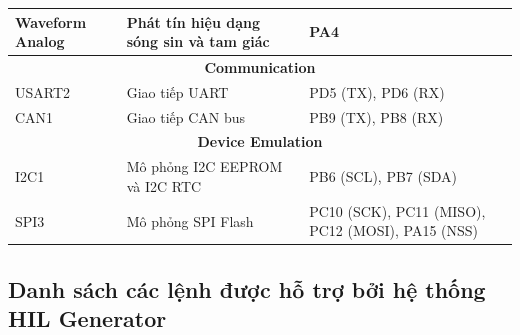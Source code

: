 \begin{table}[H]
\begin{tabularx}{\textwidth}{|l|X|X|}
Waveform Analog 
& Phát tín hiệu dạng sóng sin và tam giác 
& PA4 \\
\hline

\multicolumn{3}{|c|}{\textbf{Communication}} \\
\hline

USART2 
& Giao tiếp UART 
& PD5 (TX), PD6 (RX) \\
\hline

CAN1 
& Giao tiếp CAN bus 
& PB9 (TX), PB8 (RX) \\
\hline

\multicolumn{3}{|c|}{\textbf{Device Emulation}} \\
\hline

I2C1 
& Mô phỏng I2C EEPROM và I2C RTC 
& PB6 (SCL), PB7 (SDA) \\
\hline

SPI3 
& Mô phỏng SPI Flash 
& PC10 (SCK), PC11 (MISO), PC12 (MOSI), PA15 (NSS) \\
\hline

\end{tabularx}

\label{tab:hil_peripherals_pins}
\end{table}


\subsection{Danh sách các lệnh được hỗ trợ bởi hệ thống HIL Generator}
\renewcommand{\arraystretch}{1.3}

